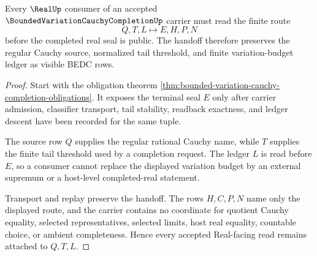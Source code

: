 \begin{theorem}
\label{thm:bounded-variation-cauchy-completion-real-handoff}
Every $\RealUp$ consumer of an accepted $\BoundedVariationCauchyCompletionUp$ carrier must read the finite route
$$
Q,T,L \longmapsto E,H,P,N
$$
before the completed real seal is public. The handoff therefore preserves the regular Cauchy source, normalized tail threshold, and finite variation-budget ledger as visible BEDC rows.
\end{theorem}
\begin{proof}
Start with the obligation theorem \autoref{thm:bounded-variation-cauchy-completion-obligations}. It exposes the terminal seal $E$ only after carrier admission, classifier transport, tail stability, readback exactness, and ledger descent have been recorded for the same tuple.

The source row $Q$ supplies the regular rational Cauchy name, while $T$ supplies the finite tail threshold used by a completion request. The ledger $L$ is read before $E$, so a consumer cannot replace the displayed variation budget by an external supremum or a host-level completed-real statement.

Transport and replay preserve the handoff. The rows $H,C,P,N$ name only the displayed route, and the carrier contains no coordinate for quotient Cauchy equality, selected representatives, selected limits, host real equality, countable choice, or ambient completeness. Hence every accepted Real-facing read remains attached to $Q,T,L$.
\end{proof}


\begin{closurestatus}{\BoundedVariationCauchyCompletionUp}
  \theoryclosure{\seedClosure}
  \formalstatus{\unformalizedV}
\end{closurestatus}
